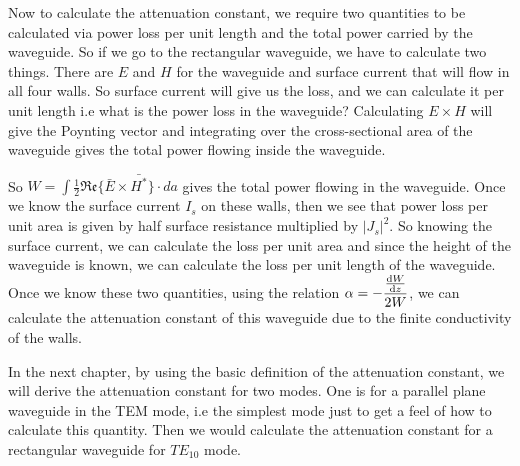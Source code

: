Now to calculate the attenuation constant, we require two quantities to be calculated via power loss per unit length and the total power carried by the waveguide. So if we go to the rectangular waveguide, we have to calculate two things. There are $E$ and $H$ for the waveguide and surface current that will flow in all four walls. So surface current will give us the loss, and we can calculate it per unit length i.e what is the power loss in the waveguide? Calculating $E\times H$ will give the Poynting vector and integrating over the cross-sectional area of the waveguide gives the total power flowing inside the waveguide. 

So $W = \int\frac{1}{2}\mathfrak{Re}\{\bar{E}\times\bar{H^*}\}\cdot{da}$ gives the total power flowing in  the waveguide. Once we know the surface current $I_{s}$ on these walls, then we see that power loss per unit area is given by half surface resistance multiplied by $|J_{s}|^{2}$. So knowing the surface current, we can calculate the loss per unit area and since the height of the waveguide is known, we can calculate the loss per unit length of the waveguide. Once we know these two quantities, using the relation $\alpha = -\dfrac{\dv{W}{z}}{2W}$, we can calculate the attenuation constant of this waveguide due to the finite conductivity of the walls.

In the next chapter, by using the basic definition of the attenuation constant, we will derive the attenuation constant for two modes. One is for a parallel plane waveguide in the TEM mode, i.e the simplest mode just to get a feel of how to calculate this quantity. Then we would calculate the attenuation constant for a rectangular waveguide for $TE_{10}$ mode. 
